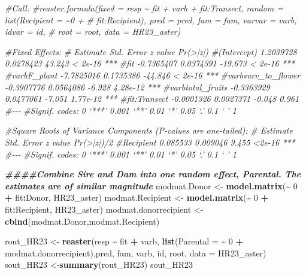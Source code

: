 \documentclass[
]{article}
\newenvironment{Shaded}{\begin{snugshade}}{\end{snugshade}}
\newcommand{\AttributeTok}[1]{\textcolor[rgb]{0.13,0.29,0.53}{#1}}
\newcommand{\CommentTok}[1]{\textcolor[rgb]{0.56,0.35,0.01}{\textit{#1}}}
\newcommand{\DecValTok}[1]{\textcolor[rgb]{0.00,0.00,0.81}{#1}}
\newcommand{\DocumentationTok}[1]{\textcolor[rgb]{0.56,0.35,0.01}{\textbf{\textit{#1}}}}
\newcommand{\FunctionTok}[1]{\textcolor[rgb]{0.13,0.29,0.53}{\textbf{#1}}}
\newcommand{\NormalTok}[1]{#1}
\newcommand{\OtherTok}[1]{\textcolor[rgb]{0.56,0.35,0.01}{#1}}
\newcommand{\SpecialCharTok}[1]{\textcolor[rgb]{0.81,0.36,0.00}{\textbf{#1}}}
\begin{document}
\begin{Shaded}
\begin{Highlighting}[]
\CommentTok{\#Call:}
\CommentTok{\#reaster.formula(fixed = resp \textasciitilde{} fit + varb + fit:Transect, random = list(Recipient = \textasciitilde{}0 + }
\CommentTok{\#    fit:Recipient), pred = pred, fam = fam, varvar = varb, idvar = id, }
\CommentTok{\#    root = root, data = HR23\_aster)}

\CommentTok{\#Fixed Effects:}
\CommentTok{\#                     Estimate Std. Error z value Pr(\textgreater{}|z|)    }
\CommentTok{\#(Intercept)         1.2039728  0.0278423  43.243  \textless{} 2e{-}16 ***}
\CommentTok{\#fit                {-}0.7365407  0.0374391 {-}19.673  \textless{} 2e{-}16 ***}
\CommentTok{\#varbF\_plant        {-}7.7825016  0.1735386 {-}44.846  \textless{} 2e{-}16 ***}
\CommentTok{\#varbsurv\_to\_flower {-}0.3907776  0.0564086  {-}6.928 4.28e{-}12 ***}
\CommentTok{\#varbtotal\_fruits   {-}0.3363929  0.0477061  {-}7.051 1.77e{-}12 ***}
\CommentTok{\#fit:Transect       {-}0.0001326  0.0027371  {-}0.048    0.961    }
\CommentTok{\#{-}{-}{-}}
\CommentTok{\#Signif. codes:  0 ‘***’ 0.001 ‘**’ 0.01 ‘*’ 0.05 ‘.’ 0.1 ‘ ’ 1}

\CommentTok{\#Square Roots of Variance Components (P{-}values are one{-}tailed):}
\CommentTok{\#          Estimate Std. Error z value Pr(\textgreater{}|z|)/2    }
\CommentTok{\#Recipient 0.085533   0.009046   9.455     \textless{}2e{-}16 ***}
\CommentTok{\#{-}{-}{-}}
\CommentTok{\#Signif. codes:  0 ‘***’ 0.001 ‘**’ 0.01 ‘*’ 0.05 ‘.’ 0.1 ‘ ’ 1}

\DocumentationTok{\#\#\#\#Combine Sire and Dam into one random effect, \textasciigrave{}Parental\textasciigrave{}. The estimates are of similar magnitude }
\NormalTok{modmat.Donor }\OtherTok{\textless{}{-}} \FunctionTok{model.matrix}\NormalTok{(}\SpecialCharTok{\textasciitilde{}} \DecValTok{0} \SpecialCharTok{+}\NormalTok{ fit}\SpecialCharTok{:}\NormalTok{Donor, HR23\_aster)}
\NormalTok{modmat.Recipient }\OtherTok{\textless{}{-}} \FunctionTok{model.matrix}\NormalTok{(}\SpecialCharTok{\textasciitilde{}} \DecValTok{0} \SpecialCharTok{+}\NormalTok{ fit}\SpecialCharTok{:}\NormalTok{Recipient, HR23\_aster)}
\NormalTok{modmat.donorrecipient }\OtherTok{\textless{}{-}} \FunctionTok{cbind}\NormalTok{(modmat.Donor,modmat.Recipient)}


\NormalTok{rout\_HR23 }\OtherTok{\textless{}{-}} \FunctionTok{reaster}\NormalTok{(resp }\SpecialCharTok{\textasciitilde{}}\NormalTok{ fit }\SpecialCharTok{+}\NormalTok{ varb, }\FunctionTok{list}\NormalTok{(}\AttributeTok{Parental =} \SpecialCharTok{\textasciitilde{}} \DecValTok{0} \SpecialCharTok{+}\NormalTok{ modmat.donorrecipient),pred, fam, varb, id, root, }\AttributeTok{data =}\NormalTok{ HR23\_aster)}
\NormalTok{sout\_HR23 }\OtherTok{\textless{}{-}}\FunctionTok{summary}\NormalTok{(rout\_HR23)}
\NormalTok{sout\_HR23}
\end{Highlighting}
\end{Shaded}
\end{document}
